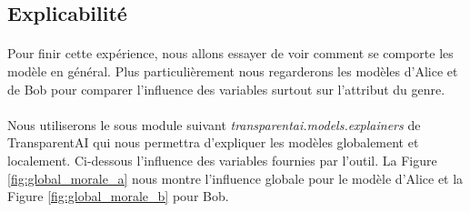 \documentclass[10pt, french, a4paper]{report}
\begin{document}
\subsection{Explicabilité}

\paragraph{}
Pour finir cette expérience, nous allons essayer de voir comment se comporte les modèle en général. Plus particulièrement nous regarderons les modèles d'Alice et de Bob pour comparer l'influence des variables surtout sur l'attribut du genre. 

\paragraph{}
Nous utiliserons le sous module suivant \textit{transparentai.models.explainers} de TransparentAI qui nous permettra d'expliquer les modèles globalement et localement. Ci-dessous l'influence des variables fournies par l'outil. La Figure \ref{fig:global_morale_a} nous montre l'influence globale pour le modèle d'Alice et la Figure \ref{fig:global_morale_b} pour Bob. 
\end{document}
